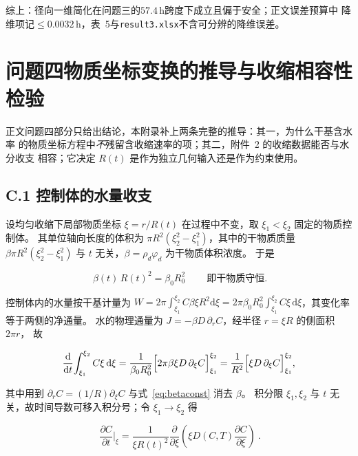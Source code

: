 \documentclass[withoutpreface,bwprint]{cumcmthesis} %
\begin{document}
\begin{appendices}
综上：径向一维简化在问题三的$57.4\,\mathrm{h}$跨度下成立且偏于安全；正文误差预算中
降维项记$\le0.0032\,\mathrm{h}$，表~5与\texttt{result3.xlsx}不含可分辨的降维误差。


\section{问题四物质坐标变换的推导与收缩相容性检验}
\label{app:q4derive}

正文问题四部分只给出结论，本附录补上两条完整的推导：其一，为什么干基含水率
的物质坐标方程中\emph{不}残留含收缩速率的项；其二，附件~2 的收缩数据能否与水分收支
相容；它决定 $R(t)$ 是作为独立几何输入还是作为约束使用。

\subsection*{C.1 控制体的水量收支}

设均匀收缩下局部物质坐标 $\xi=r/R(t)$ 在过程中不变，取 $\xi_1<\xi_2$ 固定的物质控制体。
其单位轴向长度的体积为 $\pi R^2(\xi_2^2-\xi_1^2)$，其中的干物质质量
$\beta\pi R^2(\xi_2^2-\xi_1^2)$ 与 $t$ 无关，$\beta=\rho_d\varphi_d$ 为干物质体积浓度。
于是

\begin{equation}
\label{eq:betaconst}
\boxed{\ \beta(t)\,R(t)^2=\beta_0R_0^2\ }\qquad\text{即干物质守恒.}
\end{equation}

控制体内的水量按干基计量为 $W=2\pi\!\int_{\xi_1}^{\xi_2}C\beta\xi R^2\mathrm d\xi
=2\pi\beta_0R_0^2\!\int_{\xi_1}^{\xi_2}C\xi\,\mathrm d\xi$，其变化率等于两侧的净通量。
水的物理通量为 $J=-\beta D\,\partial_rC$，经半径 $r=\xi R$ 的侧面积 $2\pi r$，
故

\begin{equation}
\frac{\mathrm d}{\mathrm dt}\!\int_{\xi_1}^{\xi_2}C\xi\,\mathrm d\xi
=\frac{1}{\beta_0R_0^2}\Bigl[2\pi\beta\xi D\,\partial_\xi C\Bigr]_{\xi_1}^{\xi_2}
=\frac{1}{R^2}\Bigl[\xi D\,\partial_\xi C\Bigr]_{\xi_1}^{\xi_2},
\end{equation}

其中用到 $\partial_rC=(1/R)\partial_\xi C$ 与式~\eqref{eq:betaconst} 消去 $\beta$。
积分限 $\xi_1,\xi_2$ 与 $t$ 无关，故时间导数可移入积分号；令 $\xi_1\to\xi_2$ 得

\begin{equation}
\label{eq:q4core}
\boxed{\ \frac{\partial C}{\partial t}\Big|_{\xi}
=\frac{1}{\xi R(t)^2}\frac{\partial}{\partial \xi}
\left(\xi D(C,T)\frac{\partial C}{\partial \xi}\right)\ }.
\end{equation}


\end{appendices}
\end{document}
